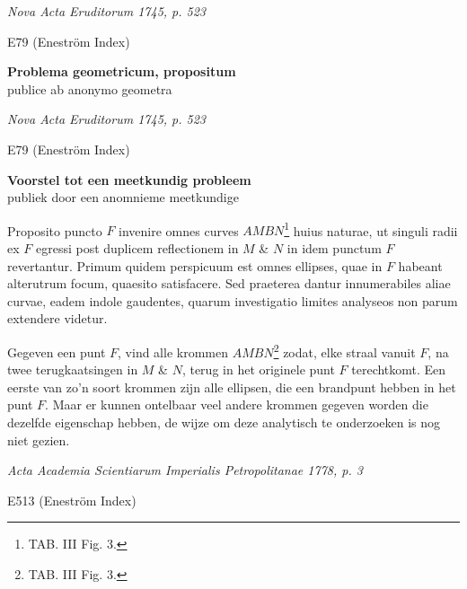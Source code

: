 \documentclass[10pt,a4paper]{article}
\begin{document}
	\begin{paracol}{2}
	\par \textit{Nova Acta Eruditorum 1745, p. 523}
	\par E79 (Eneström Index) 
	\begin{center}
		\par {}
		
		\par {\bf Problema geometricum, propositum}\\
		publice ab anonymo geometra
	\end{center}
	\switchcolumn
	\par \textit{Nova Acta Eruditorum 1745, p. 523}
	\par E79 (Eneström Index) 
	\begin{center}
		\par {}
		
		\par {\bf Voorstel tot een meetkundig probleem}\\
		publiek door een anomnieme meetkundige
	\end{center}
	\switchcolumn*
	
	
	\par Proposito puncto $F$ invenire omnes curves $AMBN$\footnote{TAB. III Fig. 3.} huius naturae, ut singuli radii ex $F$ egressi post duplicem reflectionem in $M$ \& $N$ in idem punctum $F$ revertantur.  Primum quidem perspicuum est omnes ellipses, quae in $F$ habeant alterutrum focum, quaesito satisfacere.  Sed praeterea dantur innumerabiles aliae curvae, eadem indole gaudentes, quarum investigatio limites analyseos non parum extendere videtur.
		
	\switchcolumn
	\par Gegeven een punt $F$, vind alle krommen $AMBN$\footnote{TAB. III Fig. 3.} zodat, elke straal vanuit $F$, na twee terugkaatsingen in $M$ \& $N$, terug in het originele punt $F$ terechtkomt. Een eerste van zo'n soort krommen zijn alle ellipsen, die een brandpunt hebben in het punt $F$. Maar er kunnen ontelbaar veel andere krommen gegeven worden die dezelfde eigenschap hebben, de wijze om deze analytisch te onderzoeken is nog niet gezien.

	\newpage
	\switchcolumn*
			
	\par \textit{Acta Academia Scientiarum Imperialis Petropolitanae 1778, p. 3}
	\par E513 (Eneström Index) 
	\begin{center}
		\par {}
		

\end{center}
\end{paracol}
\end{document}

